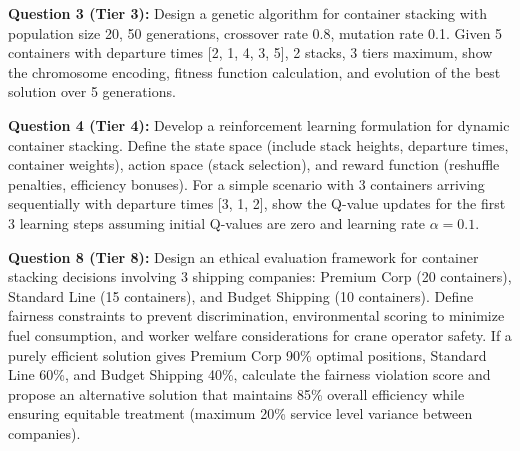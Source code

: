 \documentclass{article}
\begin{document}
\textbf{Question 3 (Tier 3):} Design a genetic algorithm for container stacking with population size 20, 50 generations, crossover rate 0.8, mutation rate 0.1. Given 5 containers with departure times [2, 1, 4, 3, 5], 2 stacks, 3 tiers maximum, show the chromosome encoding, fitness function calculation, and evolution of the best solution over 5 generations.

\textbf{Question 4 (Tier 4):} Develop a reinforcement learning formulation for dynamic container stacking. Define the state space (include stack heights, departure times, container weights), action space (stack selection), and reward function (reshuffle penalties, efficiency bonuses). For a simple scenario with 3 containers arriving sequentially with departure times [3, 1, 2], show the Q-value updates for the first 3 learning steps assuming initial Q-values are zero and learning rate $\alpha = 0.1$.

\textbf{Question 8 (Tier 8):} Design an ethical evaluation framework for container stacking decisions involving 3 shipping companies: Premium Corp (20 containers), Standard Line (15 containers), and Budget Shipping (10 containers). Define fairness constraints to prevent discrimination, environmental scoring to minimize fuel consumption, and worker welfare considerations for crane operator safety. If a purely efficient solution gives Premium Corp 90\% optimal positions, Standard Line 60\%, and Budget Shipping 40\%, calculate the fairness violation score and propose an alternative solution that maintains 85\% overall efficiency while ensuring equitable treatment (maximum 20\% service level variance between companies).
\end{document}

